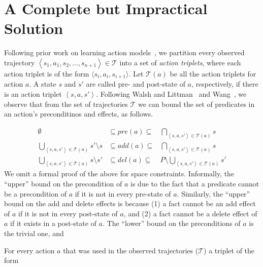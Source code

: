 \documentclass[letterpaper]{article}
\newcommand{\tuple}[1]{\ensuremath{\left \langle #1 \right \rangle }}
\begin{document}
\section{A Complete but Impractical Solution}
Following prior work on learning action models~\cite{wang1995learning,wang1994learning,walsh2008efficientLearning}, we partition every observed trajectory $\tuple{s_1,a_1,s_2,\ldots,s_{n+1}}\in\mathcal{T}$ into a set of {\em action triplets}, where each action triplet is of the form $\langle s_i, a_i, s_{i+1}\rangle$. 
    Let $\mathcal{T}(a)$ be all the action triplets for action $a$. 
    A state $s$ and $s'$ are called pre- and post-state of $a$, respectively, if there is an action triplet $\tuple{s,a,s'}$. %
    Following Walsh and Littman~ and Wang~, we observe that from the set of trajectories $\mathcal{T}$ we can bound the set of predicates in an action's preconditinos and effects, as follows. 
    
    \begin{align}
     \emptyset & \subseteq pre(a) \subseteq & \bigcap_{\tuple{s, a, s'}\in \mathcal{T}(a)} s \\
     \bigcup_{\tuple{s, a, s'}\in \mathcal{T}(a)} s'\setminus s  & \subseteq add(a) \subseteq & \bigcap_{\tuple{s, a, s'}\in \mathcal{T}(a)} s \\
     \bigcup_{\tuple{s, a, s'}\in \mathcal{T}(a)} s\setminus s' & \subseteq del(a) \subseteq & P\setminus \bigcup_{\tuple{s, a, s'}\in \mathcal{T}(a)} s'  
    \end{align}
    We omit a formal proof of the above for space constraints. Informally, the ``upper'' bound on the precondition of $a$ is due to the fact that a predicate cannot be a precondition of $a$ if it is not in every pre-state of $a$. Similarly, the ``upper'' bound on the add and delete effects is because (1) a fact cannot be an add effect of $a$ if it is not in every post-state of $a$, and (2) a fact cannot be a delete effect of $a$ if it exists in a post-state of $a$. 
    The ``lower'' bound on the preconditions of $a$ is the trivial one, and 



For every action $a$ that was used in the observed trajectories ($\mathcal{T}$) a triplet of the form 
\end{document}
